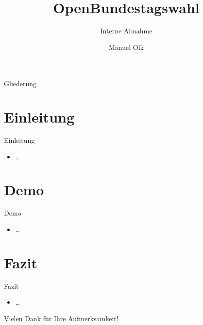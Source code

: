 \documentclass[18pt]{beamer}
\title[Interne Abnahme]{OpenBundestagswahl}
\subtitle{Interne Abnahme}
\author{Manuel Olk}
\institute{Praxis der Softwareentwicklung, WS 2013/14}
\begin{document}

\begin{frame}
\titlepage
\end{frame}

\begin{frame}{Gliederung}
\tableofcontents
\end{frame}

\section{Einleitung}
\begin{frame}{Einleitung}
\begin{itemize}
	\item \dots
\end{itemize}
\end{frame}

\section{Demo}
\begin{frame}{Demo}
\begin{itemize}
	\item \dots
\end{itemize}
\end{frame}

\section{Fazit}
\begin{frame}{Fazit}
\begin{itemize}
	\item \dots
\end{itemize}
\end{frame}


\appendix

\begin{frame}{}

\begin{LARGE}
\begin{center}
	Vielen Dank für Ihre Aufmerksamkeit!
\end{center}
\end{LARGE}
\end{frame}
\end{document}
